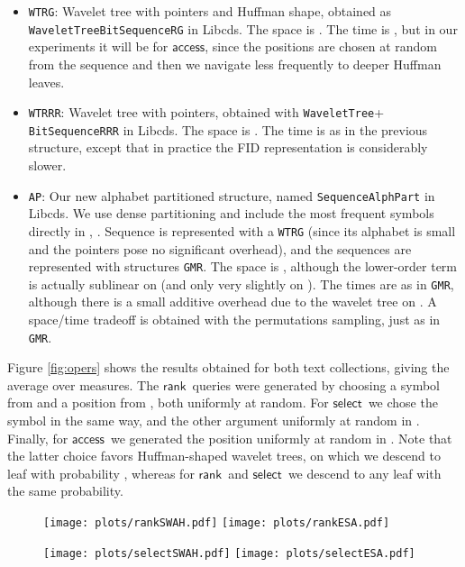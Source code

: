 \documentclass[11pt]{article}
\newcommand{\access}
    {\ensuremath{\mathsf{access}}}
\newcommand{\rank}
    {\ensuremath{\mathsf{rank}}}
\newcommand{\select}
    {\ensuremath{\mathsf{select}}}
\newcommand{\libcds}{{\sc Libcds}}
\begin{document}
\begin{table}[t]
{\begin{tabular}
\begin{itemize}
  on average \rank\ is constant-time. A space/time tradeoff, which in practice
  affects only the time for \access, is obtained by varying the permutation 
  sampling inside the chunks \cite{GMR06}.
\item \verb|WTRG|: Wavelet tree with pointers and Huffman shape, obtained as
  \verb|WaveletTree|\verb|BitSequenceRG| in \libcds. 
  The space is . The time is 
  , but in our experiments it will be  for \access,
  since the positions are chosen at random from the sequence and then we 
  navigate less frequently to deeper Huffman leaves.
\item \verb|WTRRR|: Wavelet tree with pointers, obtained with
  \verb|WaveletTree|+ \verb|BitSequenceRRR| in \libcds. The space is
  . The time is as in the previous
  structure, except that in practice the FID representation is considerably
  slower.
\item \verb|AP|: Our new alphabet partitioned structure, named 
  \verb|SequenceAlphPart| in \libcds. We use dense partitioning and include
  the  most frequent symbols directly in , . 
  Sequence  is represented with a \verb|WTRG| (since its alphabet is small 
  and the pointers pose no significant overhead), and the sequences 
   are represented with structures \verb|GMR|. The space is 
  , although the lower-order term is actually sublinear on 
   (and only
  very slightly on ). The times are as in \verb|GMR|, although there is a
  small additive overhead due to the wavelet tree on . A space/time tradeoff
  is obtained with the permutations sampling, just as in \verb|GMR|.
\end{itemize}

Figure \ref{fig:opers} shows the results obtained for both text collections,
giving the average over  measures. The \rank\ queries were generated
by choosing a symbol from  and a position from , both
uniformly at random. For \select\ we chose the symbol  in the same way, and
the other argument uniformly at random in . Finally, for \access\ 
we generated the position uniformly at random in . Note that the latter
choice favors Huffman-shaped wavelet trees, on which we descend to leaf  with
probability , whereas for \rank\ and \select\ we descend to any leaf
with the same probability.

\begin{figure}
\centerline{\texttt{[image: plots/rankSWAH.pdf]}
\texttt{[image: plots/rankESA.pdf]}}

\centerline{\texttt{[image: plots/selectSWAH.pdf]}
\texttt{[image: plots/selectESA.pdf]}}


\end{figure}
\end{tabular}}
\end{table}
\end{document}

